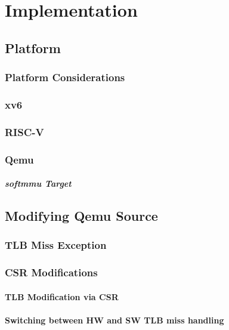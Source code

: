 \chapter{Implementation}

\label{chap:impl}

\section{Platform}
\subsection{Platform Considerations}
\subsection{xv6}
\subsection{RISC-V}
\subsection{Qemu}
\paragraph{softmmu Target}

\section{Modifying Qemu Source}
\subsection{TLB Miss Exception}
\subsection{CSR Modifications}
\subsubsection{TLB Modification via CSR}
\subsubsection{Switching between HW and SW TLB miss handling}

